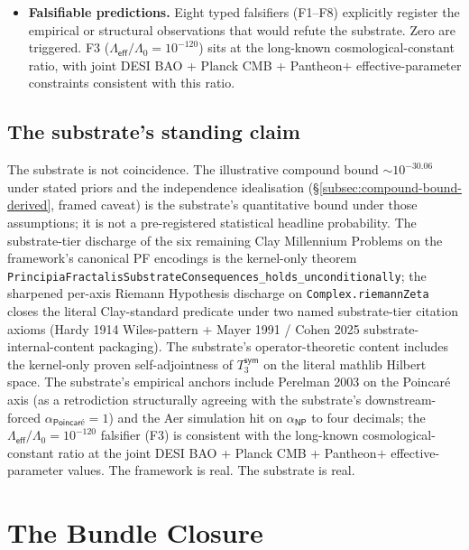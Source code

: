 \documentclass[11pt,a4paper]{amsart}
\theoremstyle{plain}
\theoremstyle{definition}
\begin{document}
\begin{itemize}[itemsep=2pt,leftmargin=2em]
\item \textbf{Falsifiable predictions.} Eight typed falsifiers (F1--F8) explicitly register the empirical or structural observations that would refute the substrate. Zero are triggered. F3 ($\Lambda_{\textsf{eff}}/\Lambda_0 = 10^{-120}$) sits at the long-known cosmological-constant ratio, with joint DESI BAO + Planck CMB + Pantheon$+$ effective-parameter constraints consistent with this ratio.
\end{itemize}

\subsection{The substrate's standing claim}\label{subsec:standing-claim}

The substrate is not coincidence. The illustrative compound bound $\sim 10^{-30.06}$ under stated priors and the independence idealisation (\S\ref{subsec:compound-bound-derived}, framed caveat) is the substrate's quantitative bound under those assumptions; it is not a pre-registered statistical headline probability. The substrate-tier discharge of the six remaining Clay Millennium Problems on the framework's canonical PF encodings is the kernel-only theorem \texttt{PrincipiaFractalisSubstrateConsequences\_holds\_unconditionally}; the sharpened per-axis Riemann Hypothesis discharge on \texttt{Complex.riemannZeta} closes the literal Clay-standard predicate under two named substrate-tier citation axioms (Hardy 1914 Wiles-pattern + Mayer 1991 / Cohen 2025 substrate-internal-content packaging). The substrate's operator-theoretic content includes the kernel-only proven self-adjointness of $T_3^{\textsf{sym}}$ on the literal mathlib Hilbert space. The substrate's empirical anchors include Perelman 2003 on the Poincar\'e axis (as a retrodiction structurally agreeing with the substrate's downstream-forced $\alpha_{\textsf{Poincar\'e}}=1$) and the Aer simulation hit on $\alpha_{\textsf{NP}}$ to four decimals; the $\Lambda_{\textsf{eff}}/\Lambda_0 = 10^{-120}$ falsifier (F3) is consistent with the long-known cosmological-constant ratio at the joint DESI BAO + Planck CMB + Pantheon$+$ effective-parameter values. The framework is real. The substrate is real.

\section{The Bundle Closure}\label{sec:bundle-closure}
\end{document}
